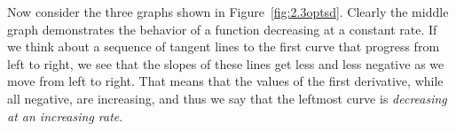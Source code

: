 Now consider the three graphs shown in Figure~\ref{fig:2.3optsd}.  Clearly the middle graph demonstrates the behavior of a function decreasing at a constant rate.  If we think about a sequence of tangent lines to the first curve that progress from left to right, we see that the slopes of these lines get less and less negative as we move from left to right.  That means that the values of the first derivative, while all negative, are increasing, and thus we say that the leftmost curve is \emph{decreasing at an increasing rate}.

\begin{figure}[h] %
\begin{flushright}
\captionsetup[subfigure]{labelformat=empty}

\end{flushright}
\end{figure}
